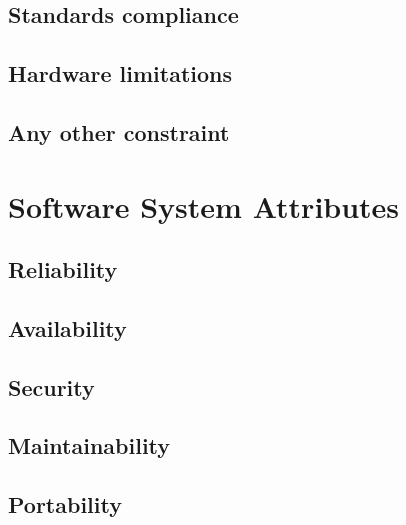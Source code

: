 \subsection{Standards compliance}
\subsection{Hardware limitations}
\subsection{Any other constraint}

\section{Software System Attributes}
\label{sec:sys_attribs}

\subsection{Reliability}
\subsection{Availability}
\subsection{Security}
\subsection{Maintainability}
\subsection{Portability}

